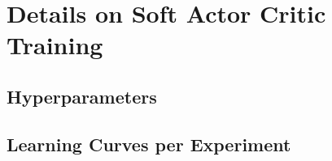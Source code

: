 \section{Details on Soft Actor Critic Training}
\subsection{Hyperparameters}




\subsection{Learning Curves per Experiment}
